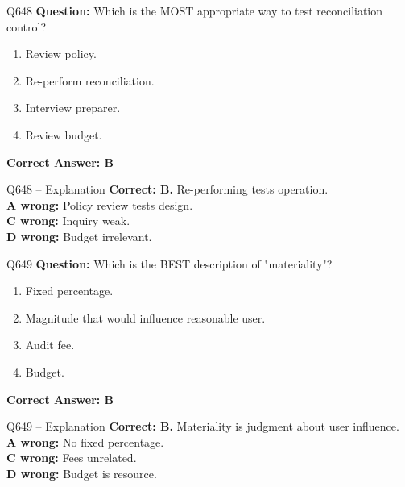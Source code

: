 \documentclass[aspectratio=169,10pt]{beamer}
\begin{document}
	\begin{frame}[t]{Q648}
		\small
		\textbf{Question:} Which is the MOST appropriate way to test reconciliation control?
		\begin{enumerate}[label=\Alph*.,itemsep=1pt,topsep=2pt]
			\item Review policy.
			\item Re-perform reconciliation.
			\item Interview preparer.
			\item Review budget.
		\end{enumerate}
		\vspace{4pt}
		\textbf{Correct Answer: B}
	\end{frame}
	
	\begin{frame}[t]{Q648 -- Explanation}
		\small
		\textbf{Correct: B.} Re-performing tests operation. \\[4pt]
		\textbf{A wrong:} Policy review tests design. \\[2pt]
		\textbf{C wrong:} Inquiry weak. \\[2pt]
		\textbf{D wrong:} Budget irrelevant.
	\end{frame}
	
	\begin{frame}[t]{Q649}
		\small
		\textbf{Question:} Which is the BEST description of "materiality"?
		\begin{enumerate}[label=\Alph*.,itemsep=1pt,topsep=2pt]
			\item Fixed percentage.
			\item Magnitude that would influence reasonable user.
			\item Audit fee.
			\item Budget.
		\end{enumerate}
		\vspace{4pt}
		\textbf{Correct Answer: B}
	\end{frame}
	
	\begin{frame}[t]{Q649 -- Explanation}
		\small
		\textbf{Correct: B.} Materiality is judgment about user influence. \\[4pt]
		\textbf{A wrong:} No fixed percentage. \\[2pt]
		\textbf{C wrong:} Fees unrelated. \\[2pt]
		\textbf{D wrong:} Budget is resource.
	\end{frame}
	
\end{document}
